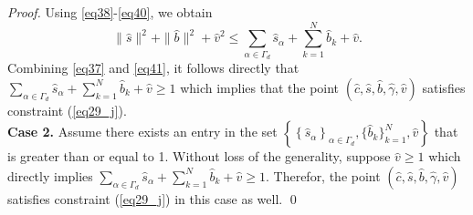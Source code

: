 \documentclass[smallextended,referee,envcountsect,,numbers]{svjour3}
\begin{document}
\begin{proof}
Using \eqref{eq38}-\eqref{eq40}, we obtain
\begin{equation} \label{eq41} 
\|\hat{s}\|^2+\|\hat{b}\|^2+{\hat{v}}^2\le \sum_{\alpha \in \Gamma_d}{\hat{s}_\alpha }+\sum_{k=1}^N\hat{b}_k+\hat{v}.
\end{equation} 
Combining \eqref{eq37} and \eqref{eq41}, it follows directly that $\sum_{\alpha \in \Gamma_d}{{\hat{s}}_{\alpha }}+\sum_{k=1}^N\hat{b}_k+\hat{v}\ge 1$ which implies that the point $\left(\hat{c},\hat{s},\hat{b},\hat{\gamma},\hat{v}\right)$ satisfies constraint (\ref{eq29_j}).\\
\noindent \textbf{Case 2.} Assume there exists an entry in the set $\left\{{\left\{{\hat{s}}_{\alpha }\right\}}_{\alpha \in \Gamma_d},\{\hat{b}_k\}_{k=1}^N,\hat{v}\right\}$ that is greater than or equal to 1. Without loss of the generality, suppose $\hat{v}\ge 1$ which directly implies $\sum_{\alpha \in \Gamma_d}{{\hat{s}}_{\alpha }}+\sum_{k=1}^N\hat{b}_k+\hat{v}\ge 1$. Therefor, the point $\left(\hat{c},\hat{s},\hat{b},\hat{\gamma},\hat{v}\right)$ satisfies constraint (\ref{eq29_j}) in this case as well. \qed 
\end{proof}
\end{document}
